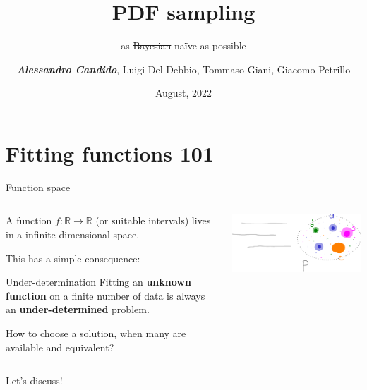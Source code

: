 \documentclass[9pt]{beamer}
\title{PDF sampling}
\subtitle{as \sout{Bayesian} na\"ive as possible}
\date{August, 2022}
\author{\textit{\textbf{Alessandro Candido}}, Luigi Del Debbio, Tommaso Giani, Giacomo Petrillo}
\begin{document}
\maketitle


\section{Fitting functions 101}

\begin{frame}{Function space}
    \begin{columns}
        \begin{column}{0.5\textwidth}
            A function $f: \mathbb{R} \to \mathbb{R}$ (or suitable intervals)
            lives in a infinite-dimensional space.
            \vspace*{20pt}

            This has a simple consequence:
            \begin{block}{Under-determination}
                Fitting an \textbf{unknown function} on a finite number of data
                is always an \textbf{under-determined} problem.
            \end{block}
            \vspace*{20pt}

            How to choose a solution, when \alert{many} are available and
            \alert{equivalent}?
        \end{column}
        \begin{column}{0.5\textwidth}
            \includegraphics[width=\textwidth]{intrinsic}
        \end{column}
    \end{columns}
\end{frame}

\begin{frame}[standout]
    Let's discuss!
\end{frame}
\end{document}
